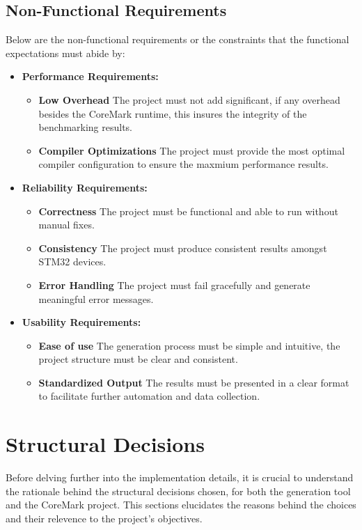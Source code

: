 \subsection{Non-Functional Requirements}
Below are the non-functional requirements or the constraints that the functional expectations must abide by:
\begin{itemize}
    \item \textbf{Performance Requirements:}
    \begin{itemize}
        \item \textbf{Low Overhead} The project must not add significant, if any overhead besides the CoreMark runtime, this insures the integrity of the benchmarking results.
        \item \textbf{Compiler Optimizations} The project must provide the most optimal compiler configuration to ensure the maxmium performance results.
    \end{itemize}
   \item \textbf{Reliability Requirements:}
   \begin{itemize}
    \item \textbf{Correctness} The project must be functional and able to run without manual fixes.
    \item \textbf{Consistency} The project must produce consistent results amongst STM32 devices.
    \item \textbf{Error Handling} The project must fail gracefully and generate meaningful error messages.
   \end{itemize}
   \item \textbf{Usability Requirements:}
   \begin{itemize}
    \item \textbf{Ease of use} The generation process must be simple and intuitive, the project structure must be clear and consistent.
    \item \textbf{Standardized Output} The results must be presented in a clear format to facilitate further automation and data collection.
   \end{itemize}
\end{itemize}

\section{Structural Decisions}
Before delving further into the implementation details, it is crucial to understand the rationale behind the structural decisions chosen, for both the generation tool and the CoreMark project. This sections elucidates the reasons behind the choices and their relevence to the project's objectives.
